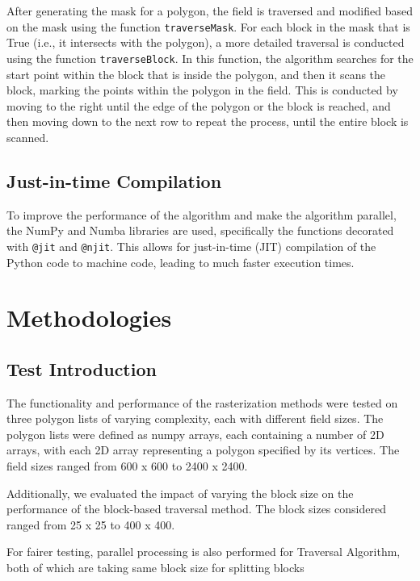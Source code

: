 \documentclass[
	a4paper, %
	10pt, %
	unnumberedsections, %
	twoside, %
]{LTJournalArticle}
\begin{document}
After generating the mask for a polygon, the field is traversed and modified based on the mask using the function \texttt{traverseMask}. For each block in the mask that is True (i.e., it intersects with the polygon), a more detailed traversal is conducted using the function \texttt{traverseBlock}. In this function, the algorithm searches for the start point within the block that is inside the polygon, and then it scans the block, marking the points within the polygon in the field. This is conducted by moving to the right until the edge of the polygon or the block is reached, and then moving down to the next row to repeat the process, until the entire block is scanned.

\subsection{Just-in-time Compilation}

To improve the performance of the algorithm and make the algorithm parallel, the NumPy and Numba libraries are used, specifically the functions decorated with \texttt{@jit} and \texttt{@njit}. This allows for just-in-time (JIT) compilation of the Python code to machine code, leading to much faster execution times.

\section{Methodologies}

\subsection{Test Introduction}

The functionality and performance of the rasterization methods were tested on three polygon lists of varying complexity, each with different field sizes. The polygon lists were defined as numpy arrays, each containing a number of 2D arrays, with each 2D array representing a polygon specified by its vertices. The field sizes ranged from 600 x 600 to 2400 x 2400.

Additionally, we evaluated the impact of varying the block size on the performance of the block-based traversal method. The block sizes considered ranged from 25 x 25 to 400 x 400.

For fairer testing, parallel processing is also performed for Traversal Algorithm, both of which are taking same block size for splitting blocks
\end{document}
